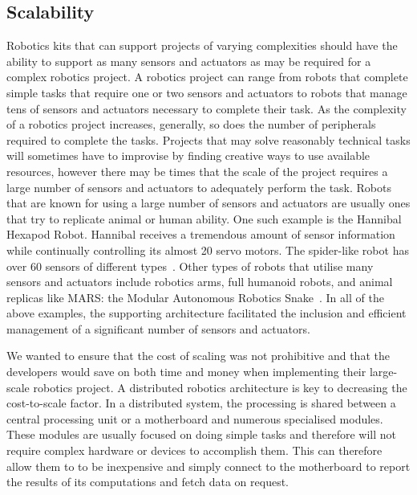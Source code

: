  

\subsection{Scalability} %
\label{sub:scalability}
Robotics kits that can support projects of varying complexities should have the ability to support as many sensors and actuators as may be required for a complex robotics project. A robotics project can range from robots that complete simple tasks that require one or two sensors and actuators to robots that manage tens of sensors and actuators necessary to complete their task. As the complexity of a robotics project increases, generally, so does the number of peripherals required to complete the tasks. Projects that may solve reasonably technical tasks will sometimes have to improvise by finding creative ways to use available resources, however there may be times that the scale of the project requires a large number of sensors and actuators to adequately perform the task. Robots that are known for using a large number of sensors and actuators are usually ones that try to replicate animal or human ability. One such example is the Hannibal Hexapod Robot. Hannibal receives a tremendous amount of sensor  information while continually controlling its almost 20 servo motors.  The spider-like robot has over 60 sensors of different types~\parencite{hannibal}. Other types of robots that utilise many sensors and actuators include robotics arms, full humanoid robots, and animal replicas like MARS: the Modular  Autonomous Robotics Snake~\parencite{mars}. In all of the above examples, the supporting architecture facilitated the inclusion and efficient management of a significant number of sensors and actuators.

 We wanted to ensure that the cost of scaling was not prohibitive and that the developers would save on both time and money when implementing their large-scale robotics project. A distributed robotics architecture is key to decreasing the cost-to-scale factor. In a distributed system, the processing is shared between a central processing unit or a motherboard and numerous specialised modules. These modules are usually focused on doing simple tasks and therefore will not require complex hardware or devices to accomplish them. This can therefore allow them to to be inexpensive and simply connect to the motherboard to report the results of its computations and fetch data on request.



